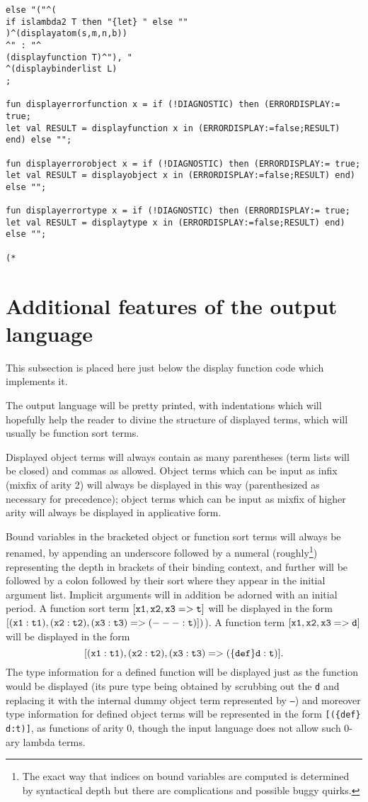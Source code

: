 \documentclass[12pt]{article}
\begin{document}
\begin{verbatim}
else "("^(
if islambda2 T then "{let} " else ""
)^(displayatom(s,m,n,b))
^" : "^
(displayfunction T)^"), "
^(displaybinderlist L)
;

fun displayerrorfunction x = if (!DIAGNOSTIC) then (ERRORDISPLAY:= true; 
let val RESULT = displayfunction x in (ERRORDISPLAY:=false;RESULT) end) else "";

fun displayerrorobject x = if (!DIAGNOSTIC) then (ERRORDISPLAY:= true; 
let val RESULT = displayobject x in (ERRORDISPLAY:=false;RESULT) end) else "";

fun displayerrortype x = if (!DIAGNOSTIC) then (ERRORDISPLAY:= true; 
let val RESULT = displaytype x in (ERRORDISPLAY:=false;RESULT) end) else "";

(*

\end{verbatim}

\newpage

\section{Additional features of the output language}

This subsection is placed here just below the display function code which implements it.

The output language will be pretty printed, with indentations which will hopefully help the reader to divine the structure of displayed terms, which will usually
be function sort terms.

Displayed object terms will always contain as many parentheses (term lists will be closed) and commas as allowed.  Object terms which can be input as infix (mixfix of arity 2) will always be displayed in this way (parenthesized as necessary for precedence);  object terms which can be input as mixfix of higher arity will always be displayed in applicative form.

Bound variables in the bracketed object or function sort terms will always be renamed, by appending an underscore followed by a numeral (roughly\footnote{The exact way that indices on bound variables are computed is determined by syntactical depth but there are complications and possible buggy quirks.}) representing the depth in brackets of their binding context, and further will be followed by a colon followed by their sort where they appear in the initial argument list.   Implicit arguments will in addition be adorned with an initial period.  A function sort term ${\mathbb {\tt [x1, x2, x3 => t]}}$ will 
be displayed in the form ${\mathbb {\tt [(x1:t1), (x2:t2), (x3:t3) => (--- :t)]}})$).  A function term $\mathbb{{\tt [x1, x2, x3 => d]}}$ will be displayed in the form $${\mathbb{\tt [(x1:t1), (x2:t2), (x3:t3) => (\{def\} d : t)]}}.$$  The type information for a defined function will be displayed just as the function would be displayed (its pure type being obtained by scrubbing out the {\tt d} and replacing it with the internal dummy object term
represented by {\tt ---}) and moreover type information for defined object terms will be represented in the form {\tt [(\{def\} d:t)]}, as functions of arity 0, though the input language does not allow such 0-ary lambda terms. 
\end{document}
